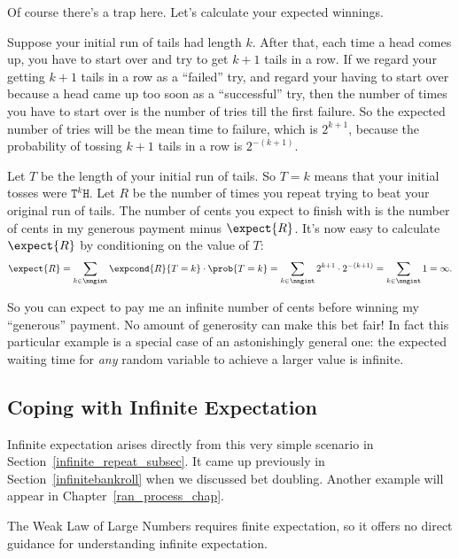 Of course there's a trap here.  Let's calculate your expected
winnings.

Suppose your initial run of tails had length $k$.  After that, each
time a head comes up, you have to start over and try to get $k+1$ tails
in a row.  If we regard your getting $k+1$ tails in a row as a
``failed'' try, and regard your having to start over because a head
came up too soon as a ``successful'' try, then the number of times you
have to start over is the number of tries till the first failure.  So
the expected number of tries will be the mean time to failure, which is
$2^{k+1}$, because the probability of tossing $k+1$ tails in a row is
$2^{-(k+1)}$.

Let $T$ be the length of your initial run of tails.  So $T = k$ means
that your initial tosses were $\texttt{T}^k\texttt{H}$.  Let $R$ be
the number of times you repeat trying to beat your original run of
tails.  The number of cents you expect to finish with is the number of
cents in my generous payment minus $\expect{R}$.  It's now easy to
calculate $\expect{R}$ by conditioning on the value of $T$:
\[
\expect{R}
     = \sum_{k \in \nngint} \expcond{R}{T=k} \cdot \prob{T=k}
     = \sum_{k \in \nngint}  2^{k+1} \cdot 2^{-(k+1)}
     = \sum_{k \in \nngint} 1 = \infty.
\]

\iffalse
\begin{align*}
\expect{R}
    & = \sum_{k \in \nngint} \expcond{R}{T=k} \cdot \prob{T=k}\\
    & = \sum_{k \in \nngint}  2^{k+1} \cdot 2^{-(k+1)}\\
    & = \sum_{k \in \nngint} 1 = \infty.
\end{align*}
\fi

So you can expect to pay me an infinite number of cents before winning
my ``generous'' payment.  No amount of generosity can make this bet
fair!  In fact this particular example is a special case of an
astonishingly general one: \iffalse worked out in
Problem~\ref{PS_infinite_repeat_expectation}\fi the expected waiting
time for \emph{any} random variable to achieve a larger value is
infinite.

\begin{editingnotes}
\subsection{Coping with Infinite Expectation}

Infinite expectation arises directly from this very simple scenario in
Section~\ref{infinite_repeat_subsec}.  It came up previously in
Section~\ref{infinitebankroll} when we discussed bet doubling.
Another example will appear in Chapter~\ref{ran_process_chap}.

The Weak Law of Large Numbers requires finite expectation, so it
offers no direct guidance for understanding infinite expectation.
\end{editingnotes}


